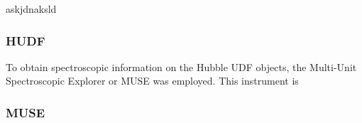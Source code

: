 \documentclass[12pt, twocolumn]{revtex4}    %
\begin{document}
askjdnaksld

\subsubsection{HUDF}

To obtain spectroscopic information on the Hubble UDF objects, the Multi-Unit Spectroscopic Explorer or MUSE was employed. This instrument is 

\subsubsection{MUSE}


\onecolumngrid
\end{document}

